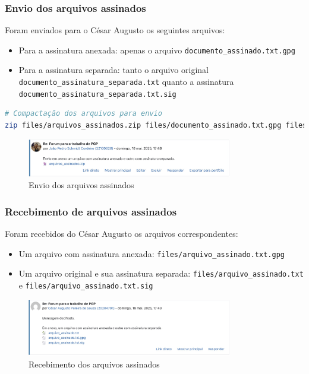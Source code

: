 \subsubsection{Envio dos arquivos assinados}

Foram enviados para o César Augusto os seguintes arquivos:
\begin{itemize}
    \item Para a assinatura anexada: apenas o arquivo \texttt{documento\_assinado.txt.gpg}
    \item Para a assinatura separada: tanto o arquivo original \texttt{documento\_assinatura\_separada.txt} quanto a assinatura \texttt{documento\_assinatura\_separada.txt.sig}
\end{itemize}

\begin{lstlisting}[language=bash]
# Compactação dos arquivos para envio
zip files/arquivos_assinados.zip files/documento_assinado.txt.gpg files/documento_assinatura_separada.txt files/documento_assinatura_separada.txt.sig
\end{lstlisting}

\begin{figure}[htb]
    \centering
    \includegraphics[width=0.8\textwidth]{images/11-envio_arquivos_assinados.jpg}
    \caption{Envio dos arquivos assinados}
    \label{fig:envio-arquivos-assinados}
\end{figure}

\subsubsection{Recebimento de arquivos assinados}

Foram recebidos do César Augusto os arquivos correspondentes:
\begin{itemize}
    \item Um arquivo com assinatura anexada: \texttt{files/arquivo\_assinado.txt.gpg}
    \item Um arquivo original e sua assinatura separada: \texttt{files/arquivo\_assinado.txt} e \texttt{files/arquivo\_assinado.txt.sig}
\end{itemize}

\begin{figure}[htb]
    \centering
    \includegraphics[width=0.8\textwidth]{images/11-recebimento_arquivos_assinados.jpg}
    \caption{Recebimento dos arquivos assinados}
    \label{fig:recebimento-arquivos-assinados}
\end{figure}

